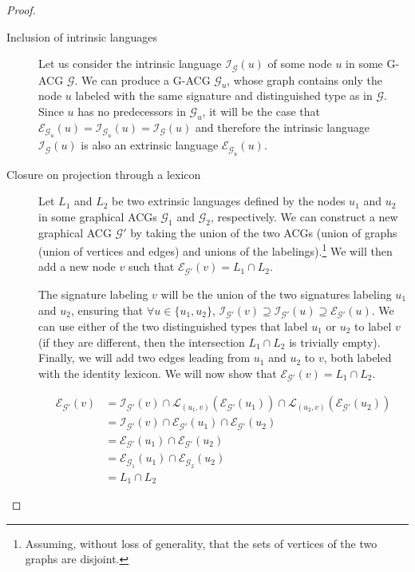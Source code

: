 \documentclass{llncs}
\begin{document}
\begin{proof}
  \begin{description}
    \item[Inclusion of intrinsic languages] Let us consider the intrinsic
      language $\mathcal{I}_{\mathcal{G}}(u)$ of some node $u$ in some G-ACG
      $\mathcal{G}$. We can produce a G-ACG $\mathcal{G}_u$, whose graph
      contains only the node $u$ labeled with the same signature and
      distinguished type as in $\mathcal{G}$. Since $u$ has no predecessors in
      $\mathcal{G}_u$, it will be the case that
      $\mathcal{E}_{\mathcal{G}_u}(u) = \mathcal{I}_{\mathcal{G}_u}(u) =
      \mathcal{I}_{\mathcal{G}}(u)$ and therefore the intrinsic language
      $\mathcal{I}_{\mathcal{G}}(u)$ is also an extrinsic language
      $\mathcal{E}_{\mathcal{G}_u}(u)$.

    \vspace{5mm}

    \item[Closure on projection through a lexicon] Let $L_1$ and $L_2$ be two
      extrinsic languages defined by the nodes $u_1$ and $u_2$ in some
      graphical ACGs $\mathcal{G}_1$ and $\mathcal{G}_2$, respectively. We can
      construct a new graphical ACG $\mathcal{G}'$ by taking the union of the
      two ACGs (union of graphs (union of vertices and edges) and unions of
      the labelings).\footnote{Assuming, without loss of generality, that the
        sets of vertices of the two graphs are disjoint.} We will then add a
      new node $v$ such that $\mathcal{E}_{\mathcal{G}'}(v) = L_1 \cap L_2$.

      The signature labeling $v$ will be the union of the two signatures
      labeling $u_1$ and $u_2$, ensuring that $\forall u \in \{u_1,
      u_2\}$, $\mathcal{I}_{\mathcal{G}'}(v) \supseteq
      \mathcal{I}_{\mathcal{G}'}(u) \supseteq
      \mathcal{E}_{\mathcal{G}'}(u)$. We can use either of the two
      distinguished types that label $u_1$ or $u_2$ to label $v$ (if
      they are different, then the intersection $L_1 \cap L_2$ is
      trivially empty). Finally, we will add two edges leading from
      $u_1$ and $u_2$ to $v$, both labeled with the identity lexicon. We
      will now show that $\mathcal{E}_{\mathcal{G}'}(v) = L_1 \cap L_2$.

      \begin{align*}
        \mathcal{E}_{\mathcal{G}'}(v) &= \mathcal{I}_{\mathcal{G}'}(v)
        \cap \mathcal{L}_{(u_1,v)}(\mathcal{E}_{\mathcal{G}'}(u_1)) \cap
        \mathcal{L}_{(u_2,v)}(\mathcal{E}_{\mathcal{G}'}(u_2)) \\ &=
        \mathcal{I}_{\mathcal{G}'}(v) \cap
        \mathcal{E}_{\mathcal{G}'}(u_1) \cap
        \mathcal{E}_{\mathcal{G}'}(u_2) \\ &=
        \mathcal{E}_{\mathcal{G}'}(u_1) \cap
        \mathcal{E}_{\mathcal{G}'}(u_2) \\ &=
        \mathcal{E}_{\mathcal{G}_1}(u_1) \cap
        \mathcal{E}_{\mathcal{G}_2}(u_2) \\ &= L_1 \cap L_2
      \end{align*}


\end{description}
\end{proof}
\end{document}
